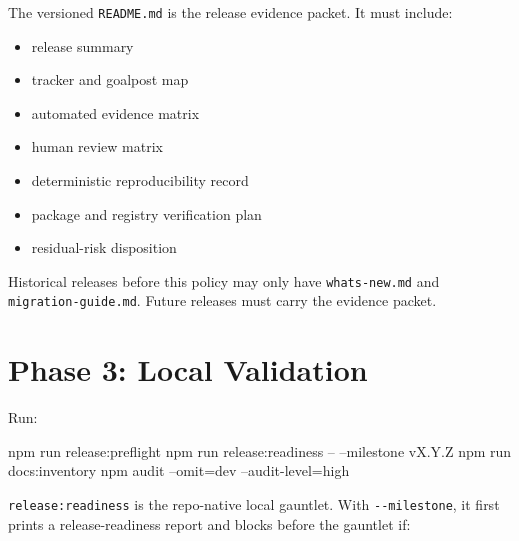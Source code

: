 The versioned \texttt{R\allowbreak{}E\allowbreak{}A\allowbreak{}D\allowbreak{}M\allowbreak{}E\allowbreak{}.\allowbreak{}m\allowbreak{}d} is the release evidence packet. It must include:

\begin{itemize}
\tightlist
\item
  release summary
\item
  tracker and goalpost map
\item
  automated evidence matrix
\item
  human review matrix
\item
  deterministic reproducibility record
\item
  package and registry verification plan
\item
  residual-risk disposition
\end{itemize}

Historical releases before this policy may only have \texttt{w\allowbreak{}h\allowbreak{}a\allowbreak{}t\allowbreak{}s\allowbreak{}-\allowbreak{}n\allowbreak{}e\allowbreak{}w\allowbreak{}.\allowbreak{}m\allowbreak{}d} and \texttt{m\allowbreak{}i\allowbreak{}g\allowbreak{}r\allowbreak{}a\allowbreak{}t\allowbreak{}i\allowbreak{}o\allowbreak{}n\allowbreak{}-\allowbreak{}g\allowbreak{}u\allowbreak{}i\allowbreak{}d\allowbreak{}e\allowbreak{}.\allowbreak{}m\allowbreak{}d}. Future releases must carry the evidence packet.

\section{Phase 3: Local Validation}\label{record-274-phase-3-local-validation}

Run:

\begin{CodeBlock}
npm run release:preflight
npm run release:readiness -- --milestone vX.Y.Z
npm run docs:inventory
npm audit --omit=dev --audit-level=high
\end{CodeBlock}

\texttt{r\allowbreak{}e\allowbreak{}l\allowbreak{}e\allowbreak{}a\allowbreak{}s\allowbreak{}e\allowbreak{}:\allowbreak{}r\allowbreak{}e\allowbreak{}a\allowbreak{}d\allowbreak{}i\allowbreak{}n\allowbreak{}e\allowbreak{}s\allowbreak{}s} is the repo-native local gauntlet. With \texttt{-\allowbreak{}-\allowbreak{}m\allowbreak{}i\allowbreak{}l\allowbreak{}e\allowbreak{}s\allowbreak{}t\allowbreak{}o\allowbreak{}n\allowbreak{}e}, it first prints a release-readiness report and blocks before the gauntlet if:

